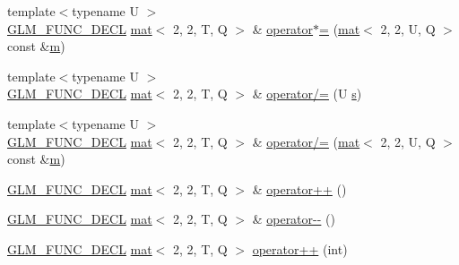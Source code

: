 \begin{DoxyCompactItemize}
\item 
{\footnotesize template$<$typename U $>$ }\\\mbox{\hyperlink{setup_8hpp_ab2d052de21a70539923e9bcbf6e83a51}{G\+L\+M\+\_\+\+F\+U\+N\+C\+\_\+\+D\+E\+CL}} \mbox{\hyperlink{structglm_1_1mat}{mat}}$<$ 2, 2, T, Q $>$ \& \mbox{\hyperlink{structglm_1_1mat_3_012_00_012_00_01_t_00_01_q_01_4_a607bdac0a14d0661db17d7400355e552}{operator$\ast$=}} (\mbox{\hyperlink{structglm_1_1mat}{mat}}$<$ 2, 2, U, Q $>$ const \&\mbox{\hyperlink{_s_d_l__opengl__glext_8h_af593500c283bf1a787a6f947f503a5c2}{m}})
\item 
{\footnotesize template$<$typename U $>$ }\\\mbox{\hyperlink{setup_8hpp_ab2d052de21a70539923e9bcbf6e83a51}{G\+L\+M\+\_\+\+F\+U\+N\+C\+\_\+\+D\+E\+CL}} \mbox{\hyperlink{structglm_1_1mat}{mat}}$<$ 2, 2, T, Q $>$ \& \mbox{\hyperlink{structglm_1_1mat_3_012_00_012_00_01_t_00_01_q_01_4_ab98e68a1fdc89639690e42ff6a66aa9f}{operator/=}} (U \mbox{\hyperlink{_s_d_l__opengl_8h_a4af680a6c683f88ed67b76f207f2e6e4}{s}})
\item 
{\footnotesize template$<$typename U $>$ }\\\mbox{\hyperlink{setup_8hpp_ab2d052de21a70539923e9bcbf6e83a51}{G\+L\+M\+\_\+\+F\+U\+N\+C\+\_\+\+D\+E\+CL}} \mbox{\hyperlink{structglm_1_1mat}{mat}}$<$ 2, 2, T, Q $>$ \& \mbox{\hyperlink{structglm_1_1mat_3_012_00_012_00_01_t_00_01_q_01_4_a63b8f35b3a04bd1ac0a293a41f221871}{operator/=}} (\mbox{\hyperlink{structglm_1_1mat}{mat}}$<$ 2, 2, U, Q $>$ const \&\mbox{\hyperlink{_s_d_l__opengl__glext_8h_af593500c283bf1a787a6f947f503a5c2}{m}})
\item 
\mbox{\hyperlink{setup_8hpp_ab2d052de21a70539923e9bcbf6e83a51}{G\+L\+M\+\_\+\+F\+U\+N\+C\+\_\+\+D\+E\+CL}} \mbox{\hyperlink{structglm_1_1mat}{mat}}$<$ 2, 2, T, Q $>$ \& \mbox{\hyperlink{structglm_1_1mat_3_012_00_012_00_01_t_00_01_q_01_4_a3ba78b4e4d01ba944fab26b8286acac4}{operator++}} ()
\item 
\mbox{\hyperlink{setup_8hpp_ab2d052de21a70539923e9bcbf6e83a51}{G\+L\+M\+\_\+\+F\+U\+N\+C\+\_\+\+D\+E\+CL}} \mbox{\hyperlink{structglm_1_1mat}{mat}}$<$ 2, 2, T, Q $>$ \& \mbox{\hyperlink{structglm_1_1mat_3_012_00_012_00_01_t_00_01_q_01_4_a5ce05a8b04a45281df148d4b9a0bd5dc}{operator-\/-\/}} ()
\item 
\mbox{\hyperlink{setup_8hpp_ab2d052de21a70539923e9bcbf6e83a51}{G\+L\+M\+\_\+\+F\+U\+N\+C\+\_\+\+D\+E\+CL}} \mbox{\hyperlink{structglm_1_1mat}{mat}}$<$ 2, 2, T, Q $>$ \mbox{\hyperlink{structglm_1_1mat_3_012_00_012_00_01_t_00_01_q_01_4_a35434d16d35db785027c0d3b8b9c78b7}{operator++}} (int)

\end{DoxyCompactItemize}
